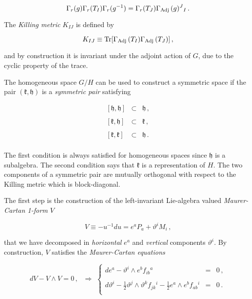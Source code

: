 \documentclass[12pt,a4paper]{article}
\begin{document}
\begin{equation}
\Gamma_{r}(g)\Gamma_{r}(T_{I})\Gamma_{r}(g^{-1}) = 
\Gamma_{r}(T_{J}) \Gamma_{\rm Adj}\,(g)^{J}{}_{I}\, . 
\end{equation}

The {\it Killing metric} $K_{IJ}$ is defined by 

\begin{equation}
K_{IJ} \equiv {\rm Tr} 
[\Gamma_{\rm Adj}\,(T_{I}) \Gamma_{\rm Adj}\,(T_{J}) ]\, ,  
\end{equation}

\noindent
and by construction it is invariant under the adjoint action of $G$,
due to the cyclic property of the trace.

The homogeneous space $G/H$ can be used to construct a symmetric space
if the pair $(\mathfrak{k},\mathfrak{h})$ is a {\it symmetric pair}
satisfying

\begin{equation}
  \begin{array}{rcl}
\left[\mathfrak{h},\mathfrak{h} \right] & \subset & \mathfrak{h}\, ,\\
& & \\
\left[\mathfrak{k},\mathfrak{h} \right] & \subset & \mathfrak{k}\, ,\\
& & \\
\left[\mathfrak{k},\mathfrak{k} \right] & \subset & \mathfrak{h}\, .\\
  \end{array}
\end{equation}

\noindent
The first condition is always satisfied for homogeneous spaces since
$\mathfrak{h}$ is a subalgebra. The second condition says that
$\mathfrak{k}$ is a representation of $H$. The two components of a
symmetric pair are mutually orthogonal with respect to the Killing
metric which is block-diagonal.

The first step is the construction of the left-invariant
Lie-algebra valued {\it Maurer-Cartan 1-form} $V$

\begin{equation}
\label{eq:M-Cdef}
V \equiv - u^{-1}du =  e^{a}P_{a}+\vartheta^{i}M_{i}\, ,  
\end{equation}

\noindent
that we have decomposed in {\it horizontal} $e^{a}$ and {\it vertical}
components $\vartheta^{i}$. By construction, $V$ satisfies the {\it
  Maurer-Cartan equations}

\begin{equation}
dV- V\wedge V=0\, ,
\,\,\,\,
\Rightarrow\,\,
\left\{
  \begin{array}{lcl}
de^{a} -\vartheta^{i}\wedge e^{b} f_{ib}{}^{a} & = & 0\, ,\\
& & \\
d\vartheta^{i} 
-\frac{1}{2}\vartheta^{j}\wedge 
\vartheta^{k} f_{jk}{}^{i}
-\frac{1}{2}e^{a}\wedge e^{b}  
f_{ab}{}^{i} & = & 0\, .\\
  \end{array}
\right.  
\end{equation}
\end{document}

